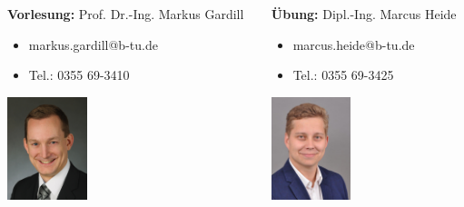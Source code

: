 \begin{frame}
    \begin{columns}[onlytextwidth]
        \begin{column}{0.5\textwidth}
            \textbf{Vorlesung:} Prof. Dr.-Ing. Markus Gardill
            \begin{itemize}
                \item markus.gardill@b-tu.de
                \item Tel.: 0355 69-3410
            \end{itemize}
            \begin{center}
                \includegraphics[height=3cm]{fig/photo_gardill}
            \end{center}
        \end{column}
        \begin{column}{0.5\textwidth}
            \textbf{Übung:} Dipl.-Ing. Marcus Heide
            \begin{itemize}
                \item marcus.heide@b-tu.de
                \item Tel.: 0355 69-3425
            \end{itemize}
            \begin{center}
                \includegraphics[height=3cm]{fig/photo_heide}
            \end{center}
        \end{column}
    \end{columns}

\end{frame}